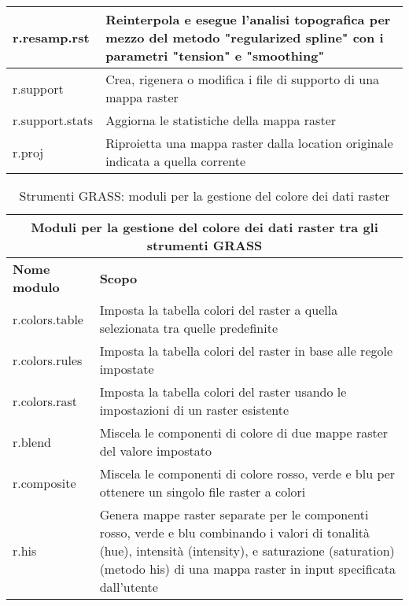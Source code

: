 \begin{table}[ht]
\begin{tabular}{|p{4cm}|p{12cm}|}
  \hline r.resamp.rst & Reinterpola e esegue l'analisi topografica per mezzo del metodo "regularized spline" con i parametri "tension" e "smoothing" \\
  \hline r.support & Crea, rigenera o modifica i file di supporto di una mappa raster \\
  \hline r.support.stats & Aggiorna le statistiche della mappa raster \\
  \hline r.proj & Riproietta una mappa raster dalla location originale indicata a quella corrente \\
\hline
\end{tabular}
\end{table}

\begin{table}[ht]
\centering
\caption{Strumenti GRASS: moduli per la gestione del colore dei dati raster}\medskip
 \begin{tabular}{|p{4cm}|p{12cm}|}
  \hline \multicolumn{2}{|c|}{\textbf{Moduli per la gestione del colore dei dati raster tra gli strumenti GRASS}} \\
  \hline \textbf{Nome modulo} & \textbf{Scopo} \\
  \hline r.colors.table & Imposta la tabella colori del raster a quella selezionata tra quelle predefinite \\
  \hline r.colors.rules & Imposta la tabella colori del raster in base alle regole impostate \\
  \hline r.colors.rast & Imposta la tabella colori del raster usando le impostazioni di un raster esistente \\
  \hline r.blend & Miscela le componenti di colore di due mappe raster del valore impostato \\
  \hline r.composite & Miscela le componenti di colore rosso, verde e blu per ottenere un singolo file raster a colori \\
  \hline r.his & Genera mappe raster separate per le componenti rosso, verde e blu combinando i valori di tonalità (hue), intensità (intensity), e saturazione (saturation) (metodo his) di una mappa raster in input specificata dall'utente \\
\hline
\end{tabular}
\end{table}

